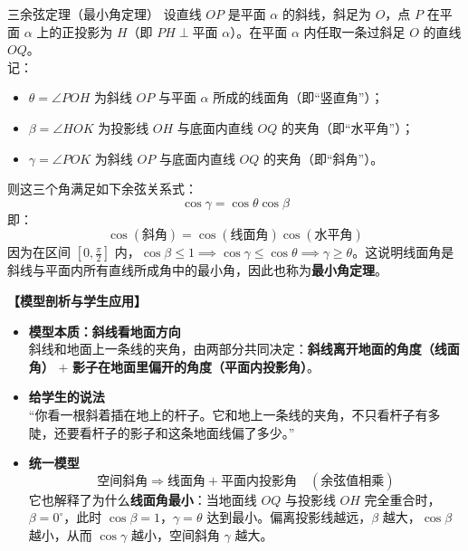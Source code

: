 \documentclass[11pt,a4paper]{ctexart}
\begin{document}
\begin{theorembox}{三余弦定理（最小角定理）}
设直线 $OP$ 是平面 $\alpha$ 的斜线，斜足为 $O$，点 $P$ 在平面 $\alpha$ 上的正投影为 $H$（即 $PH \perp \text{平面 } \alpha$）。在平面 $\alpha$ 内任取一条过斜足 $O$ 的直线 $OQ$。\\
记：
\begin{itemize}
    \item $\theta = \angle POH$ 为斜线 $OP$ 与平面 $\alpha$ 所成的线面角（即“竖直角”）；
    \item $\beta = \angle HOK$ 为投影线 $OH$ 与底面内直线 $OQ$ 的夹角（即“水平角”）；
    \item $\gamma = \angle POK$ 为斜线 $OP$ 与底面内直线 $OQ$ 的夹角（即“斜角”）。
\end{itemize}
则这三个角满足如下余弦关系式：
\[ \cos\gamma = \cos\theta \cos\beta \]
即：
\[ \cos(\text{斜角}) = \cos(\text{线面角}) \cos(\text{水平角}) \]
因为在区间 $\left[0, \frac{\pi}{2}\right]$ 内，$\cos\beta \le 1 \implies \cos\gamma \le \cos\theta \implies \gamma \ge \theta$。这说明线面角是斜线与平面内所有直线所成角中的最小角，因此也称为\textbf{最小角定理}。
\end{theorembox}

\noindent\textbf{【模型剖析与学生应用】}
\begin{itemize}
    \item \textbf{模型本质：斜线看地面方向} \\
    斜线和地面上一条线的夹角，由两部分共同决定：\textbf{斜线离开地面的角度（线面角）} $+$ \textbf{影子在地面里偏开的角度（平面内投影角）}。
    \item \textbf{给学生的说法} \\
    “你看一根斜着插在地上的杆子。它和地上一条线的夹角，不只看杆子有多陡，还要看杆子的影子和这条地面线偏了多少。”
    \item \textbf{统一模型} \\
    \[ \text{空间斜角} \Rightarrow \text{线面角} + \text{平面内投影角} \quad (\text{余弦值相乘}) \]
    它也解释了为什么\textbf{线面角最小}：当地面线 $OQ$ 与投影线 $OH$ 完全重合时，$\beta = 0^\circ$，此时 $\cos\beta = 1$，$\gamma = \theta$ 达到最小。偏离投影线越远，$\beta$ 越大，$\cos\beta$ 越小，从而 $\cos\gamma$ 越小，空间斜角 $\gamma$ 越大。
\end{itemize}
\end{document}
